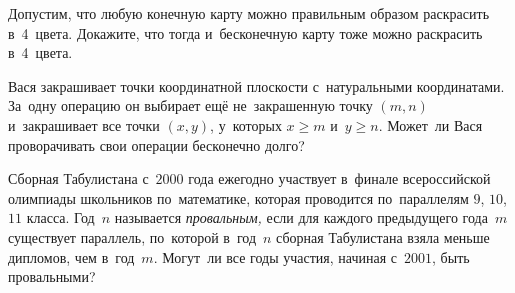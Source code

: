 \begin{problems}
\item
Допустим, что любую конечную карту можно правильным образом раскрасить
в~4~цвета.
Докажите, что тогда и~бесконечную карту тоже можно раскрасить в~4~цвета.

\item
Вася закрашивает точки координатной плоскости с~натуральными координатами.
За~одну операцию он выбирает ещё не~закрашенную точку $(m, n)$ и~закрашивает
все точки $(x, y)$, у~которых $x \geq m$ и~$y \geq n$.
Может~ли Вася проворачивать свои операции бесконечно долго?

\item
Сборная Табулистана с~$2000$ года ежегодно участвует в~финале всероссийской
олимпиады школьников по~математике, которая проводится по~параллелям
$9$, $10$, $11$ класса.
Год~$n$ называется \emph{провальным,} если для каждого предыдущего года~$m$
существует параллель, по~которой в~год~$n$ сборная Табулистана взяла меньше
дипломов, чем в~год~$m$.
Могут~ли все годы участия, начиная с~$2001$, быть провальными?






\end{problems}
